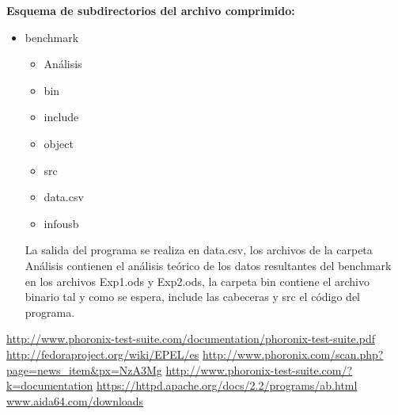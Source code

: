 \documentclass[a4paper, 10pt]{article} %
\begin{document}
\textbf{Esquema de subdirectorios del archivo comprimido:}
\begin{itemize}
\item benchmark
\begin{itemize}
\item Análisis
\item bin
\item include
\item object
\item src
\item data.csv
\item infousb
\end{itemize}
La salida del programa se realiza en data.csv, los archivos de la carpeta Análisis contienen el análisis teórico de los datos resultantes del benchmark en los archivos Exp1.ods y Exp2.ods, la carpeta bin contiene el archivo binario tal y como se espera, include las cabeceras y src el código del programa.
\end{itemize} 

\pagebreak

\begin{thebibliography}{99}
 \url{http://www.phoronix-test-suite.com/documentation/phoronix-test-suite.pdf}
 \url{http://fedoraproject.org/wiki/EPEL/es}
 \url{http://www.phoronix.com/scan.php?page=news_item&px=NzA3Mg}
 \url{http://www.phoronix-test-suite.com/?k=documentation}
 \url{https://httpd.apache.org/docs/2.2/programs/ab.html}
 \url{www.aida64.com/downloads}
\end{thebibliography}
\end{document}
